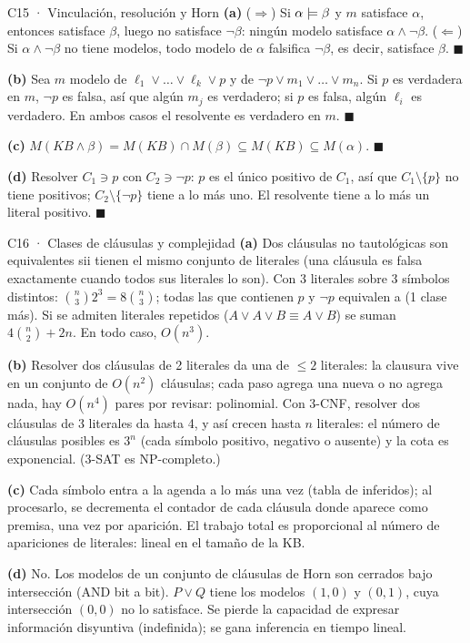 \begin{solucion}{C15 · Vinculación, resolución y Horn}
\textbf{(a)} ($\Rightarrow$) Si $\alpha\models\beta$ y $m$ satisface $\alpha$, entonces satisface $\beta$, luego no satisface
$\neg\beta$: ningún modelo satisface $\alpha\wedge\neg\beta$. ($\Leftarrow$) Si $\alpha\wedge\neg\beta$ no tiene modelos, todo
modelo de $\alpha$ falsifica $\neg\beta$, es decir, satisface $\beta$. $\blacksquare$

\textbf{(b)} Sea $m$ modelo de $\ell_1\vee\dots\vee\ell_k\vee p$ y de $\neg p\vee m_1\vee\dots\vee m_n$. Si $p$ es verdadera en $m$,
$\neg p$ es falsa, así que algún $m_j$ es verdadero; si $p$ es falsa, algún $\ell_i$ es verdadero. En ambos casos
el resolvente es verdadero en $m$. $\blacksquare$

\textbf{(c)} $M(KB\wedge\beta)=M(KB)\cap M(\beta)\subseteq M(KB)\subseteq M(\alpha)$. $\blacksquare$

\textbf{(d)} Resolver $C_1\ni p$ con $C_2\ni\neg p$: $p$ es el único positivo de $C_1$, así que $C_1\setminus\{p\}$ no
tiene positivos; $C_2\setminus\{\neg p\}$ tiene a lo más uno. El resolvente tiene a lo más un literal positivo. $\blacksquare$
\end{solucion}

\begin{solucion}{C16 · Clases de cláusulas y complejidad}
\textbf{(a)} Dos cláusulas no tautológicas son equivalentes sii tienen el mismo conjunto de literales
(una cláusula es falsa exactamente cuando todos sus literales lo son). Con 3 literales sobre 3 símbolos
distintos: $\binom{n}{3}2^3=8\binom n3$; todas las que contienen $p$ y $\neg p$ equivalen a  (1 clase más). Si se
admiten literales repetidos ($A\vee A\vee B\equiv A\vee B$) se suman $4\binom n2+2n$. En todo caso, $O(n^3)$.

\textbf{(b)} Resolver dos cláusulas de 2 literales da una de $\le2$ literales: la clausura vive en un
conjunto de $O(n^2)$ cláusulas; cada paso agrega una nueva o no agrega nada, hay $O(n^4)$ pares por
revisar: polinomial. Con 3-CNF, resolver dos cláusulas de 3 literales da hasta 4, y así crecen hasta $n$
literales: el número de cláusulas posibles es $3^n$ (cada símbolo positivo, negativo o ausente) y la cota
es exponencial. (3-SAT es NP-completo.)

\textbf{(c)} Cada símbolo entra a la agenda a lo más una vez (tabla de inferidos); al procesarlo, se
decrementa el contador de cada cláusula donde aparece como premisa, una vez por aparición. El trabajo
total es proporcional al número de apariciones de literales: lineal en el tamaño de la KB.

\textbf{(d)} No. Los modelos de un conjunto de cláusulas de Horn son cerrados bajo intersección (AND
bit a bit). $P\vee Q$ tiene los modelos $(1,0)$ y $(0,1)$, cuya intersección $(0,0)$ no lo satisface. Se pierde
la capacidad de expresar información disyuntiva (indefinida); se gana inferencia en tiempo lineal.
\end{solucion}

